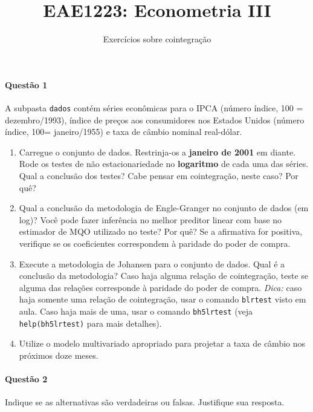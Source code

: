 \documentclass[10pt,a4paper]{article}
\title{\large EAE1223: Econometria III}
\author{\normalsize Exercícios sobre cointegração}
\date{}
\begin{document}
	\maketitle
	
\paragraph{Questão 1} A subpasta \texttt{dados} contém séries econômicas para o IPCA (número índice, 100 = dezembro/1993), índice de preços aos consumidores nos Estados Unidos (número índice, 100= janeiro/1955) e taxa de câmbio nominal real-dólar.
	
	
	\begin{enumerate}
		\item Carregue o conjunto de dados. Restrinja-os a \textbf{janeiro de 2001} em diante. Rode os testes de não estacionariedade no \textbf{logaritmo} de cada uma das séries. Qual a conclusão dos testes? Cabe pensar em cointegração, neste caso? Por quê?
		
		\item Qual a conclusão da metodologia de Engle-Granger no conjunto de dados (em log)? Você pode fazer inferência no melhor preditor linear com base no estimador de MQO utilizado no teste? Por quê? Se a afirmativa for positiva, verifique se os coeficientes correspondem à paridade do poder de compra.
		
		\item Execute a metodologia de Johansen para o conjunto de dados. Qual é a conclusão da metodologia? Caso haja alguma relação de cointegração, teste se alguma das relações corresponde à paridade do poder de compra. \textit{Dica:} caso haja somente uma relação de cointegração, usar o comando \texttt{blrtest} visto em aula. Caso haja mais de uma, usar o comando \texttt{bh5lrtest} (veja \texttt{help(bh5lrtest)} para mais detalhes).
		
		\item Utilize o modelo multivariado apropriado para projetar a taxa de câmbio nos próximos doze meses.
\end{enumerate}

	\paragraph{Questão 2} Indique se as alternativas são verdadeiras ou falsas. Justifique sua resposta.
\end{document}
